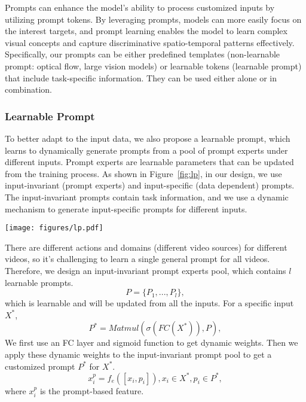 \documentclass[letterpaper, 10 pt, conference]{ieeeconf}
\begin{document}
Prompts can enhance the model's ability to process customized inputs by utilizing prompt tokens. By leveraging prompts, models can more easily focus on the interest targets, and prompt learning enables the model to learn complex visual concepts and capture discriminative spatio-temporal patterns effectively. Specifically, our prompts can be either predefined templates (non-learnable prompt: optical flow, large vision models) or learnable tokens (learnable prompt) that include task-specific information. They can be used either alone or in combination.

\subsubsection{Learnable Prompt}
To better adapt to the input data, we also propose a learnable prompt, which learns to dynamically generate prompts from a pool of prompt experts under different inputs. Prompt experts are learnable parameters that can be updated from the training process. As shown in Figure~\ref{fig:lp}, in our design, we use input-invariant (prompt experts) and input-specific (data dependent) prompts. The input-invariant prompts contain task information, and we use a dynamic mechanism to generate input-specific prompts for different inputs. 
\begin{figure*}
    \centering
    \texttt{[image: figures/lp.pdf]}
    \vspace{-5mm}
    \caption{{\bf Learnable prompt:} Learning input-invariant (prompt experts) and input-specific (data dependent) prompt knowledge. The input-invariant prompts will be updated from all the inputs, which contain task information, and we use a dynamic mechanism to generate input-specific prompts for different inputs. Add/Mul means element-wise operations. $B\times S\times C$ is the input features' shape, and $l$ is the expert's number in the prompt pool.}
    \label{fig:lp} 
\end{figure*}

There are different actions and domains (different video sources) for different videos, so it's challenging to learn a single general prompt for all videos. Therefore, we design an input-invariant prompt experts pool, which contains $l$ learnable prompts.
 \begin{equation}
P = \{P_1, ..., P_l\}, 
 \end{equation}
which is learnable and will be updated from all the inputs. For a specific input $X^*$,
 \begin{equation}
P^* = Matmul(\sigma(FC(X^*)), P), 
 \end{equation}
We first use an FC layer and sigmoid function to get dynamic weights. Then we apply these dynamic weights to the input-invariant prompt pool to get a customized prompt $P^*$ for $X^*$.
 \begin{equation}
x_i^p= f_e([x_i,p_i]), x_i\in X^*,p_i \in P^*, 
 \end{equation}
where $x_i^p$ is the prompt-based feature.
\end{document}
